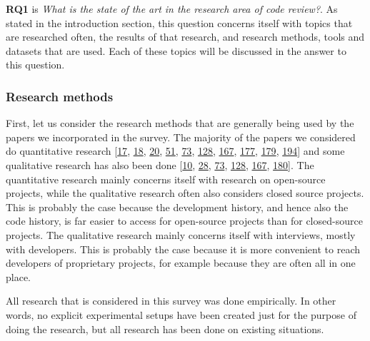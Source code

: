 \documentclass[]{book}
\begin{document}
\textbf{RQ1} is \emph{What is the state of the art in the research area
of code review?}. As stated in the introduction section, this question
concerns itself with topics that are researched often, the results of
that research, and research methods, tools and datasets that are used.
Each of these topics will be discussed in the answer to this question.

\subsubsection{Research methods}\label{research-methods}

First, let us consider the research methods that are generally being
used by the papers we incorporated in the survey. The majority of the
papers we considered do quantitative research
{[}\protect\hyperlink{ref-baysal2016investigating}{17},
\protect\hyperlink{ref-baysal2013influence}{18},
\protect\hyperlink{ref-beller2014modern}{20},
\protect\hyperlink{ref-czerwonka2015code}{51},
\protect\hyperlink{ref-gousios2014exploratory}{73},
\protect\hyperlink{ref-mcintosh2014impact}{128},
\protect\hyperlink{ref-shimagaki2016study}{167},
\protect\hyperlink{ref-thongtanunam2017review}{177},
\protect\hyperlink{ref-thongtanunam2015should}{179},
\protect\hyperlink{ref-zanjani2016automatically}{194}{]} and some
qualitative research has also been done
{[}\protect\hyperlink{ref-bacchelli2013expectations}{10},
\protect\hyperlink{ref-bird2015lessons}{28},
\protect\hyperlink{ref-gousios2014exploratory}{73},
\protect\hyperlink{ref-mcintosh2014impact}{128},
\protect\hyperlink{ref-shimagaki2016study}{167},
\protect\hyperlink{ref-thongtanunam2014reda}{180}{]}. The quantitative
research mainly concerns itself with research on open-source projects,
while the qualitative research often also considers closed source
projects. This is probably the case because the development history, and
hence also the code history, is far easier to access for open-source
projects than for closed-source projects. The qualitative research
mainly concerns itself with interviews, mostly with developers. This is
probably the case because it is more convenient to reach developers of
proprietary projects, for example because they are often all in one
place.

All research that is considered in this survey was done empirically. In
other words, no explicit experimental setups have been created just for
the purpose of doing the research, but all research has been done on
existing situations.
\end{document}
